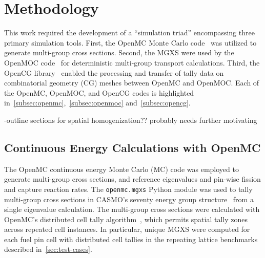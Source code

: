 \section{Methodology}
\label{sec:methodology}


This work required the development of a ``simulation triad'' encompassing three primary simulation tools. First, the OpenMC Monte Carlo code~\citep{romano2013openmc} was utilized to generate multi-group cross sections. Second, the MGXS were used by the OpenMOC code~\citep{boyd2014openmoc} for deterministic multi-group transport calculations. Third, the OpenCG library~\citep{boyd2015opencg} enabled the processing and transfer of tally data on combinatorial geometry (CG) meshes between OpenMC and OpenMOC. Each of the OpenMC, OpenMOC, and OpenCG codes is highlighted in~\autoref{subsec:openmc},~\autoref{subsec:openmoc} and~\autoref{subsec:opencg}.

-outline sections for spatial homogenization?? probably needs further motivating



\subsection{Continuous Energy Calculations with OpenMC}
\label{subsec:openmc}

The OpenMC continuous energy Monte Carlo (MC) code \citep{romano2013openmc} was employed to generate multi-group cross sections, and reference eigenvalues and pin-wise fission and capture reaction rates. The \texttt{openmc.mgxs} Python module was used to tally multi-group cross sections in CASMO's seventy energy group structure~\citep{rhodes2006casmo} from a single eigenvalue calculation. The multi-group cross sections were calculated with OpenMC's distributed cell tally algorithm~\citep{lax2014distribcell}, which permits spatial tally zones across repeated cell instances. In particular, unique MGXS were computed for each fuel pin cell with distributed cell tallies in the repeating lattice benchmarks described in~\autoref{sec:test-cases}. 

